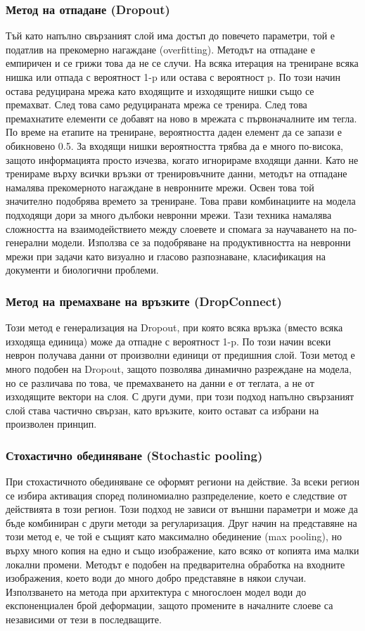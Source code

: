 \subsubsection{Метод на отпадане (Dropout)}
Тъй като напълно свързаният слой има достъп до повечето параметри, той е податлив на прекомерно нагаждане (overfitting). Методът на отпадане е емпиричен и се грижи това да не се случи. На всяка итерация на трениране всяка нишка или отпада с вероятност 1-p или остава с вероятност p. По този начин остава редуцирана мрежа като входящите и изходящите нишки също се премахват. След това само редуцираната мрежа се тренира. След това премахнатите елементи се добавят на ново в мрежата с първоначалните им тегла.
По време на етапите на трениране, вероятността даден елемент да се запази е обикновено 0.5. За входящи нишки вероятността трябва да е много по-висока, защото информацията просто изчезва, когато игнорираме входящи данни.
Като не тренираме върху всички връзки от тренировъчните данни, методът на отпадане намалява прекомерното нагаждане в невронните мрежи. Освен това той значително подобрява времето за трениране. Това прави комбинациите на модела подходящи дори за много дълбоки невронни мрежи. Тази техника намалява сложността на взаимодействието между слоевете и спомага за научаването на по-генерални модели. Използва се за подобряване на продуктивността на невронни мрежи при задачи като визуално и гласово разпознаване, класификация на документи и биологични проблеми.

\subsubsection{Метод на премахване на връзките (DropConnect)}
Този метод е генерализация на Dropout, при която всяка връзка (вместо всяка изходяща единица) може да отпадне с вероятност 1-p. По този начин всеки неврон получава данни от произволни единици от предишния слой.
Този метод е много подобен на Dropout, защото позволява динамично разреждане на модела, но се различава по това, че премахването на данни е от теглата, а не от изходящите вектори на слоя. С други думи, при този подход напълно свързаният слой става частично свързан, като връзките, които остават са избрани на произволен принцип.

\subsubsection{Стохастично обединяване (Stochastic pooling)}
При стохастичното обединяване се оформят региони на действие. За всеки регион се избира активация според полиномиално разпределение, което е следствие от действията в този регион. Този подход не зависи от външни параметри и може да бъде комбиниран с други методи за регуларизация. 
Друг начин на представяне на този метод е, че той е същият като максимално обединение (max pooling), но върху много копия на едно и също изображение, като всяко от копията има малки локални промени. Методът е подобен на предварителна обработка на входните изображения, което води до много добро представяне в някои случаи. Използването на метода при архитектура с многослоен модел води до експоненциален брой деформации, защото промените в началните слоеве са независими от тези в последващите.


